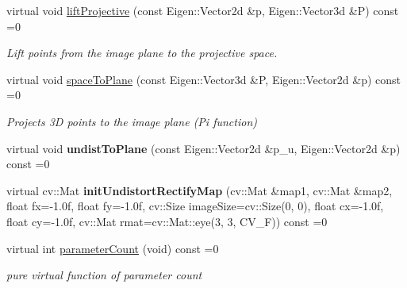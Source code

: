 \begin{DoxyCompactItemize}
\mbox{\label{classcamodocal_1_1Camera_a680e97bfecab33cd833f914ee811d12d}} 
virtual void \hyperlink{classcamodocal_1_1Camera_a680e97bfecab33cd833f914ee811d12d}{lift\+Projective} (const Eigen\+::\+Vector2d \&p, Eigen\+::\+Vector3d \&P) const =0
\begin{DoxyCompactList}\small\item\em Lift points from the image plane to the projective space. \end{DoxyCompactList}\item 
\mbox{\label{classcamodocal_1_1Camera_acf49bd1ef0919e0faf89d060dc497b52}} 
virtual void \hyperlink{classcamodocal_1_1Camera_acf49bd1ef0919e0faf89d060dc497b52}{space\+To\+Plane} (const Eigen\+::\+Vector3d \&P, Eigen\+::\+Vector2d \&p) const =0
\begin{DoxyCompactList}\small\item\em Projects 3D points to the image plane (Pi function) \end{DoxyCompactList}\item 
\mbox{\label{classcamodocal_1_1Camera_aa139629842798823cb38dce0019f7a49}} 
virtual void {\bfseries undist\+To\+Plane} (const Eigen\+::\+Vector2d \&p\+\_\+u, Eigen\+::\+Vector2d \&p) const =0
\item 
\mbox{\label{classcamodocal_1_1Camera_a79dbf1282a9d4a4dc4a8f1e65cfc657a}} 
virtual cv\+::\+Mat {\bfseries init\+Undistort\+Rectify\+Map} (cv\+::\+Mat \&map1, cv\+::\+Mat \&map2, float fx=-\/1.\+0f, float fy=-\/1.\+0f, cv\+::\+Size image\+Size=cv\+::\+Size(0, 0), float cx=-\/1.\+0f, float cy=-\/1.\+0f, cv\+::\+Mat rmat=cv\+::\+Mat\+::eye(3, 3, C\+V\+\_\+F)) const =0
\item 
\mbox{\label{classcamodocal_1_1Camera_a05ed9804daf6803907c716da2581204c}} 
virtual int \hyperlink{classcamodocal_1_1Camera_a05ed9804daf6803907c716da2581204c}{parameter\+Count} (void) const =0
\begin{DoxyCompactList}\small\item\em pure virtual function of parameter count \end{DoxyCompactList}\item 
\mbox{\label{classcamodocal_1_1Camera_a40f385799b9ab055cf69b720835ad151}} 

\end{DoxyCompactItemize}
